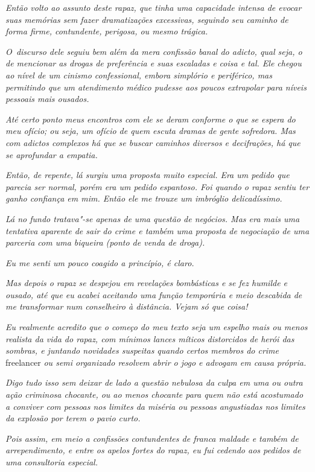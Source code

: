 \emph{Então volto ao assunto deste rapaz, que tinha uma capacidade
intensa de evocar suas memórias sem fazer dramatizações excessivas,
seguindo seu caminho de forma firme, contundente, perigosa, ou mesmo
trágica.}

\emph{O~discurso dele seguiu bem além da mera confissão banal do adicto,
qual seja, o de mencionar as drogas de preferência e suas escaladas e
coisa e tal. Ele chegou ao nível de um cinismo confessional, embora
simplório e periférico, mas permitindo que um atendimento médico pudesse
aos poucos extrapolar para níveis pessoais mais ousados.}

\emph{Até certo ponto meus encontros com ele se deram conforme o que se
espera do meu ofício; ou seja, um ofício de quem escuta dramas de gente
sofredora. Mas com adictos complexos há que se buscar caminhos diversos
e decifrações, há que se aprofundar a empatia.}

\emph{Então, de repente, lá surgiu uma proposta muito especial. Era um
pedido que parecia ser normal, porém era um pedido espantoso. Foi quando
o rapaz sentiu ter ganho confiança em mim. Então ele me trouxe um
imbróglio delicadíssimo.}

\emph{Lá no fundo tratava"-se apenas de uma questão de negócios. Mas era
mais uma tentativa aparente de sair do crime e também uma proposta de
negociação de uma parceria com uma biqueira (ponto de venda de droga).}

\emph{Eu me senti um pouco coagido a princípio, é claro.}

\emph{Mas depois o rapaz se despejou em revelações bombásticas e se fez
humilde e ousado, até que eu acabei aceitando uma função temporária e
meio descabida de me transformar num conselheiro à distância. Vejam só
que coisa!}

\emph{Eu realmente acredito que o começo do meu texto seja um espelho
mais ou menos realista da vida do rapaz, com mínimos lances míticos
distorcidos de herói das sombras, e juntando novidades suspeitas quando
certos membros do crime} freelancer \emph{ou semi organizado resolvem abrir o
jogo e advogam em causa própria.}

\emph{Digo tudo isso sem deixar de lado a questão nebulosa da culpa em
uma ou outra ação criminosa chocante, ou ao menos chocante para quem não
está acostumado a conviver com pessoas nos limites da miséria ou pessoas
angustiadas nos limites da explosão por terem o pavio curto.}

\emph{Pois assim, em meio a confissões contundentes de franca maldade e
também de arrependimento, e entre os apelos fortes do rapaz, eu fui
cedendo aos pedidos de uma consultoria especial.}

